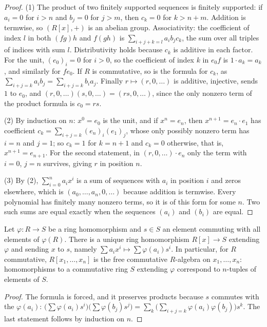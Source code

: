 \begin{proof}
(1) The product of two finitely supported sequences is finitely supported: if $a_i = 0$ for $i > n$ and $b_j = 0$ for $j > m$, then $c_k = 0$ for $k > n + m$. Addition is termwise, so $(R[x], +)$ is an abelian group.
Associativity: the coefficient of index $l$ in both $(fg)h$ and $f(gh)$ is $\sum_{i + j + k = l}a_ib_jc_k$, the sum over all triples of indices with sum $l$. Distributivity holds because $c_k$ is additive in each factor. For the
unit, $(e_0)_i = 0$ for $i > 0$, so the coefficient of index $k$ in $e_0f$ is $1 \cdot a_k = a_k$, and similarly for $fe_0$. If $R$ is commutative, so is the formula for $c_k$, as $\sum_{i + j = k}a_ib_j = \sum_{i + j = k}b_ia_j$.
Finally $r \mapsto (r, 0, \ldots)$ is additive, injective, sends $1$ to $e_0$, and $(r, 0, \ldots)(s, 0, \ldots) = (rs, 0, \ldots)$, since the only nonzero term of the product formula is $c_0 = rs$.

(2) By induction on $n$: $x^0 = e_0$ is the unit, and if $x^n = e_n$, then $x^{n+1} = e_n \cdot e_1$ has coefficient $c_k = \sum_{i + j = k}(e_n)_i(e_1)_j$, whose only possibly nonzero term has $i = n$ and $j = 1$; so
$c_k = 1$ for $k = n + 1$ and $c_k = 0$ otherwise, that is, $x^{n+1} = e_{n+1}$. For the second statement, in $(r, 0, \ldots) \cdot e_n$ only the term with $i = 0$, $j = n$ survives, giving $r$ in position $n$.

(3) By (2), $\sum_{i=0}^na_ix^i$ is a sum of sequences with $a_i$ in position $i$ and zeros elsewhere, which is $(a_0, \ldots, a_n, 0, \ldots)$ because addition is termwise. Every polynomial has finitely many nonzero terms,
so it is of this form for some $n$. Two such sums are equal exactly when the sequences $(a_i)$ and $(b_i)$ are equal.
\end{proof}

\begin{proposition}\label{rings:proposition-polynomial-universal}
Let $\varphi \colon R \to S$ be a ring homomorphism and $s \in S$ an element commuting with
all elements of $\varphi(R)$. There is a unique ring homomorphism $R[x] \to S$ extending
$\varphi$ and sending $x$ to $s$, namely $\sum a_i x^i \mapsto \sum \varphi(a_i) s^i$. In particular,
for $R$ commutative, $R[x_1, \ldots, x_n]$ is the free commutative $R$-algebra on
$x_1, \ldots, x_n$: homomorphisms to a commutative ring $S$ extending $\varphi$ correspond
to $n$-tuples of elements of $S$.
\end{proposition}

\begin{proof}
The formula is forced, and it preserves products because $s$ commutes with the
$\varphi(a_i)$: $\bigl(\sum \varphi(a_i)s^i\bigr)\bigl(\sum \varphi(b_j)s^j\bigr) = \sum_k \bigl(\sum_{i+j=k} \varphi(a_i)\varphi(b_j)\bigr)s^k$.
The last statement follows by induction on $n$.
\end{proof}

